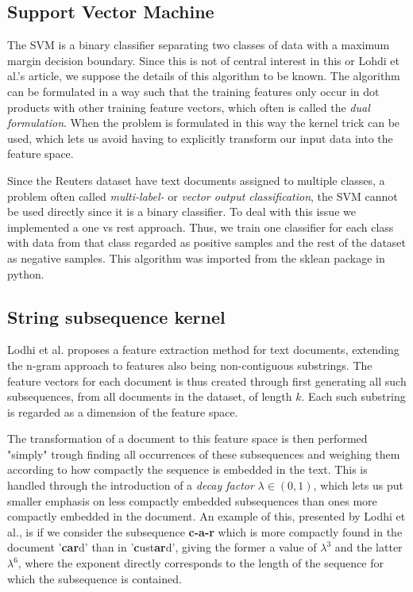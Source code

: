 
\subsection{Support Vector Machine}
The SVM is a binary classifier separating two classes of data with a maximum margin decision boundary. Since this is not of central interest in this or Lohdi et al.'s article, we suppose the details of this algorithm to be known. The algorithm can be formulated in a way such that the training features only occur in dot products with other training feature vectors, which often is called the \textit{dual formulation}. When the problem is formulated in this way the kernel trick can be used, which lets us avoid having to explicitly transform our input data into the feature space. 

Since the Reuters dataset have text documents assigned to multiple classes, a problem often called\textit{ multi-label-} or \textit{vector output classification}, the SVM cannot be used directly since it is a binary classifier. To deal with this issue we implemented a one vs rest approach. Thus, we train one classifier for each class with data from that class regarded as positive samples and the rest of the dataset as negative samples. This algorithm was imported from the sklean package in python. 

\subsection{String subsequence kernel}
Lodhi et al. proposes a feature extraction method for text documents, extending the n-gram approach to features also being non-contiguous substrings. The feature vectors for each document is thus created through first generating all such subsequences, from all documents in the dataset, of length $ k $. Each such substring is regarded as a dimension of the feature space. 

The transformation of a document to this feature space is then performed "simply" trough finding all occurrences of these subsequences and weighing them according to how compactly the sequence is embedded in the text. This is handled through the introduction of a \textit{decay factor} $ \lambda \in (0,1) $, which lets us put smaller emphasis on less compactly embedded subsequences than ones more compactly embedded in the document. An example of this, presented by Lodhi et al., is if we consider the subsequence \textbf{c-a-r} which is more compactly found in the document '\textbf{car}d' than in   '\textbf{c}ust\textbf{ar}d', giving the former a value of $ \lambda^3 $ and the latter $ \lambda^6 $, where the exponent directly corresponds to the length of the sequence for which the subsequence is contained.

